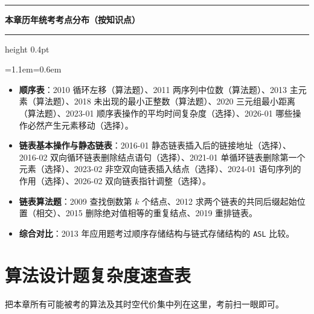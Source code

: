 \documentclass[11pt,openany,UTF8]{ctexbook}
\newcommand{\callouthead}[2]{%
  \par\addvspace{7pt}\noindent
  {\color{#1}\rule[-0.15em]{3pt}{1.05em}}\hspace{0.5em}%
  {\bfseries\color{#1}#2}\par\nobreak\vspace{-0.35em}%
  {\color{rulesep}\hrule height 0.4pt}\nobreak\vspace{0.45em}%
  \begingroup\small\setlength{\parindent}{0pt}%
  \leftskip=1.1em\rightskip=0.6em\noindent\ignorespaces}
\newcommand{\calloutend}{\par\endgroup\addvspace{7pt}}
\newenvironment{callexam}[1]{\callouthead{exambar}{#1}}{\calloutend}
\begin{document}
\begin{callexam}{本章历年统考考点分布（按知识点）}
\begin{itemize}
\item \textbf{顺序表}：2010 循环左移（算法题）、2011 两序列中位数（算法题）、2013 主元素（算法题）、2018 未出现的最小正整数（算法题）、2020 三元组最小距离（算法题）、2023-01 顺序表操作的平均时间复杂度（选择）、2026-01 哪些操作必然产生元素移动（选择）。
\item \textbf{链表基本操作与静态链表}：2016-01 静态链表插入后的链接地址（选择）、2016-02 双向循环链表删除结点语句（选择）、2021-01 单循环链表删除第一个元素（选择）、2023-02 非空双向链表插入结点（选择）、2024-01 语句序列的作用（选择）、2026-02 双向链表指针调整（选择）。
\item \textbf{链表算法题}：2009 查找倒数第 $k$ 个结点、2012 求两个链表的共同后缀起始位置（相交）、2015 删除绝对值相等的重复结点、2019 重排链表。
\item \textbf{综合对比}：2013 年应用题考过顺序存储结构与链式存储结构的 \texttt{ASL} 比较。
\end{itemize}
\end{callexam}

\section*{算法设计题复杂度速查表}

把本章所有可能被考的算法及其时空代价集中列在这里，考前扫一眼即可。
\end{document}
